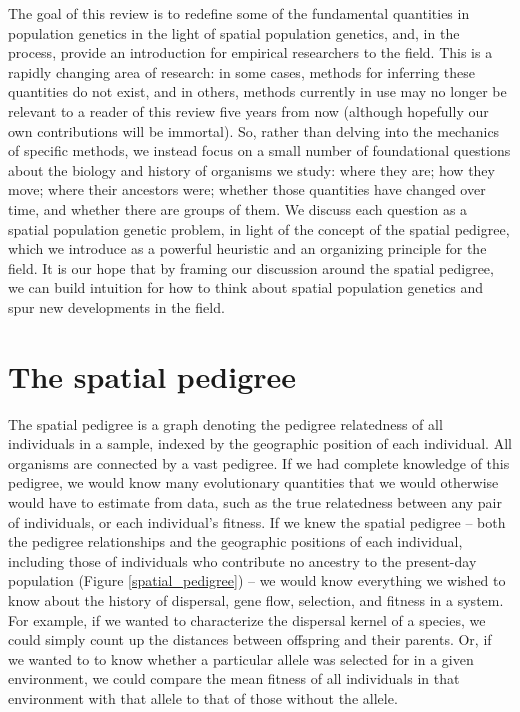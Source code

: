 \documentclass{ar-1col}
\begin{document}
The goal of this review
is to redefine some of the fundamental quantities in population genetics 
in the light of spatial population genetics, 
and, in the process, provide an introduction for empirical researchers
to the field.
This is a rapidly changing area of research:
in some cases, methods for inferring these quantities do not exist, 
and in others, 
methods currently in use may no longer be relevant
to a reader of this review five years from now
(although hopefully our own contributions will be immortal).
So, rather than delving into the mechanics of specific methods,
we instead focus on a small number of foundational questions 
about the biology and history of organisms we study:
where they are; how they move; where their ancestors were;
whether those quantities have changed over time, 
and whether there are groups of them.
We discuss each question
as a spatial population genetic problem, 
in light of the concept of the spatial pedigree,
which we introduce as a powerful heuristic
and an organizing principle for the field.
It is our hope that by framing our discussion around the spatial pedigree, 
we can build intuition for how to think about spatial population genetics 
and spur new developments in the field.


\section{The spatial pedigree}

The spatial pedigree is
a graph denoting the pedigree relatedness of all individuals in a sample,
indexed by the geographic position of each individual.
All organisms are connected by a vast pedigree.
If we had complete knowledge of this pedigree,
we would know many evolutionary quantities
that we would otherwise would have to estimate from data,
such as the true relatedness between any pair of individuals,
or each individual's fitness.
If we knew the spatial pedigree -- 
both the pedigree relationships
and the geographic positions of each individual,
including those of individuals
who contribute no ancestry to the present-day population 
(Figure \ref{spatial_pedigree}) -- 
we would know everything we wished to know about
the history of dispersal, gene flow,
selection, and fitness in a system.
For example, if we wanted to characterize the dispersal kernel of a species,
we could simply count up the distances between offspring and their parents.
Or, if we wanted to to know whether a particular allele
was selected for in a given environment,
we could compare the mean fitness of all individuals in that environment with that allele
to that of those without the allele.
\end{document}
